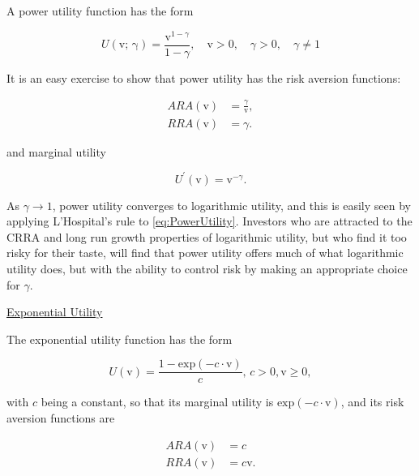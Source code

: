 \documentclass[graybox,envcountchap,sectrefs]{svmono}\usepackage[]{graphicx}\usepackage[]{xcolor}
\begin{document}
\begin{appendices}
A power utility function has the form

\begin{equation}
\mathrm{\mathsf{\mathit{U}}(v;\,\gamma)}=\dfrac{\mathrm{v}^{1-\gamma}}{1-\gamma},\quad\mathrm{v}>0,\quad\gamma>0,\quad\gamma\neq1\label{eq:PowerUtility}
\end{equation}

It is an easy exercise to show that power utility has the risk aversion
functions:

\begin{subequations}
\begin{align}
ARA\left(\mathrm{v}\right) & =\frac{\gamma}{\mathit{\mathrm{\mathrm{v}}}},\label{eq:ARAPowerUtility}\\
RRA\left(\mathrm{v}\right) & =\gamma.\label{eq:RRAPowerUtility}
\end{align}
\end{subequations}

and marginal utility

\begin{equation}
\mathit{U^{\prime}}(\mathit{\mathrm{v}})=\mathrm{v}^{-\gamma}.\label{eq:MarginalPowerUtility}
\end{equation}

As $\gamma\longrightarrow1$, power utility converges to logarithmic
utility, and this is easily seen by applying L'Hospital's rule to
\eqref{eq:PowerUtility}. Investors who are attracted to the CRRA
and long run growth properties of logarithmic utility, but who find
it too risky for their taste, will find that power utility offers
much of what logarithmic utility does, but with the ability to control
risk by making an appropriate choice for $\gamma$.

\medskip{}

\uline{Exponential Utility}

The exponential utility function has the form

\begin{equation}
U(\mathrm{v})=\frac{1-\mathrm{exp}(-c\cdot\mathrm{v})}{c},\,c>0,\mathrm{v}\geqslant0,\label{eq:ExponentialUtility}
\end{equation}

with $c$ being a constant, so that its marginal utility is $\mathrm{exp}(-c\cdot\mathrm{v})$,
and its risk aversion functions are

\begin{subequations}
\begin{align}
ARA\left(\mathrm{v}\right) & =c\label{eq:ARAExponentialUtility}\\
RRA\left(\mathrm{v}\right) & =c\mathrm{v}.\label{eq:RRAExponentialUtility}
\end{align}
\end{subequations}


\end{appendices}
\end{document}
